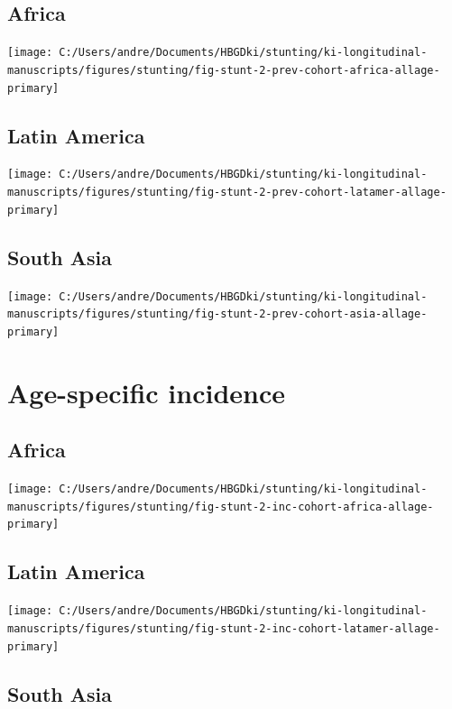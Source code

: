 \documentclass[9pt,]{book}
\begin{document}
\subsection{Africa}\label{africa-1}

\texttt{[image: C:/Users/andre/Documents/HBGDki/stunting/ki-longitudinal-manuscripts/figures/stunting/fig-stunt-2-prev-cohort-africa-allage-primary]}

\subsection{Latin America}\label{latin-america-1}

\texttt{[image: C:/Users/andre/Documents/HBGDki/stunting/ki-longitudinal-manuscripts/figures/stunting/fig-stunt-2-prev-cohort-latamer-allage-primary]}

\subsection{South Asia}\label{south-asia-1}

\texttt{[image: C:/Users/andre/Documents/HBGDki/stunting/ki-longitudinal-manuscripts/figures/stunting/fig-stunt-2-prev-cohort-asia-allage-primary]}

\section{Age-specific incidence}\label{age-specific-incidence}

\subsection{Africa}\label{africa-2}

\texttt{[image: C:/Users/andre/Documents/HBGDki/stunting/ki-longitudinal-manuscripts/figures/stunting/fig-stunt-2-inc-cohort-africa-allage-primary]}

\subsection{Latin America}\label{latin-america-2}

\texttt{[image: C:/Users/andre/Documents/HBGDki/stunting/ki-longitudinal-manuscripts/figures/stunting/fig-stunt-2-inc-cohort-latamer-allage-primary]}

\subsection{South Asia}\label{south-asia-2}
\end{document}
